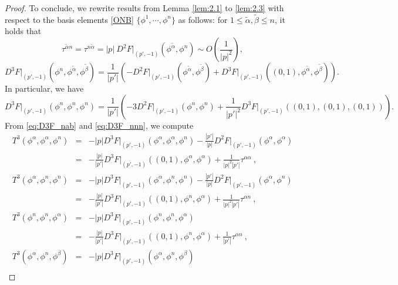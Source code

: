\documentclass[10pt,a4paper]{amsart}
\begin{document}
\begin{proof}
To conclude, we rewrite results from Lemma \ref{lem:2.1} to \ref{lem:2.3} with respect to the basis elements
\eqref{ONB} $\{\phi^1, \cdots, \phi^n\}$ as follows:
for $1 \leq \tilde{\alpha}, \tilde{\beta}\leq n$, it holds that
\begin{equation} \label{eq:tau_an}
    \tau^{\tilde{\alpha}n} = \tau^{n \tilde{\alpha} } = |p| \  D^2 F\Big|_{(p',-1)}(\phi^{\tilde{\alpha}}, \phi^n) \sim O \left( \frac{1}{|p|^2}    \right),
\end{equation}
\begin{equation}  \label{eq:D3F_nab}
    D^3 F\Big|_{(p',-1)} (\phi^n,\phi^{\tilde{\alpha}}, \phi^{\tilde{\beta}} ) =  \frac{1}{|p'|} \left( -D^2 F\Big|_{(p',-1)}(\phi^{\tilde{\alpha}}, \phi^{\tilde{\beta}}) + D^3 F\Big|_{(p',-1)}((0,1),\phi^{\tilde{\alpha}}, \phi^{\tilde{\beta}}) \right).
\end{equation}
In particular, we have
\begin{equation}  \label{eq:D3F_nnn}
    D^3 F\Big|_{(p',-1)} (\phi^n,\phi^n, \phi^n ) = \frac{1}{|p'|} \left( -3 D^2 F\Big|_{(p',-1)}(\phi^{n}, \phi^{n}) + \frac{1}{|p'|^2}  D^3 F\Big|_{(p',-1)}((0,1),(0,1),(0,1)) \right).
\end{equation}
From \eqref{eq:D3F_nab} and \eqref{eq:D3F_nnn}, we compute
\begin{eqnarray*}
T^3 (\phi^{\alpha}, \phi^{\alpha}, \phi^{n})    
     & = & - |p| D^3 F\Big|_{(p',-1)} (\phi^{\alpha}, \phi^{\alpha}, \phi^{n}) - \frac{|p'|}{|p|} D^2 F\Big|_{(p',-1)} (\phi^{\alpha}, \phi^{\alpha})    \\
    & = & - \frac{|p|}{|p'|} D^3 F\Big|_{(p',-1)} ((0,1),\phi^{\alpha}, \phi^{\alpha}) + \frac{1}{|p|^2|p'|}  \tau^{\alpha \alpha} \ , \\
    T^3 (\phi^{\alpha}, \phi^n, \phi^n) & = & - |p| D^3 F\Big|_{(p',-1)} (\phi^{\alpha}, \phi^n, \phi^n) - \frac{|p'|}{|p|} D^2 F\Big|_{(p',-1)} (\phi^{\alpha}, \phi^n) \\
     & = & - \frac{|p|}{|p'|} D^3 F\Big|_{(p',-1)} ((0,1), \phi^n, \phi^{\alpha}) + \frac{1}{|p|^2|p'|} \tau^{\alpha n} \ , \\
    T^3 (\phi^{n}, \phi^{n}, \phi^{\alpha}) & = & - |p| D^3 F\Big|_{(p',-1)} (\phi^n, \phi^n, \phi^{\alpha}) \\
    & = & - \frac{|p|}{|p'|} D^3 F\Big|_{(p',-1)} ((0,1), \phi^n, \phi^{\alpha}) + \frac{1}{|p'|} \tau^{\alpha n} \ , \\ 
    T^3 (\phi^{\alpha}, \phi^n, \phi^{\beta}) & = & -|p| D^3 F\Big|_{(p',-1)} (\phi^{\alpha}, \phi^n, \phi^{\beta})  \\

\end{eqnarray*}
\end{proof}
\end{document}
